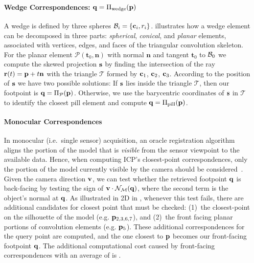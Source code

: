 \paragraph{Wedge Correspondences: $\mathbf{q}=\Pi_\text{wedge}(\mathbf{p})$}
A wedge is defined by three spheres $\mathcal{B}_i = \{\mathbf{c}_i, r_i\}$.   illustrates how a wedge element can be decomposed in three parts: \emph{spherical}, \emph{conical}, and \emph{planar} elements, associated with vertices, edges, and faces of the triangular convolution skeleton. For the planar element $\mathcal{P}(\mathbf{t}_0,\mathbf{n})$ with normal $\mathbf{n}$ and tangent $\mathbf{t}_0$ to $\mathcal{B}_0$
%
we compute the skewed projection $\mathbf{s}$ by finding the intersection of the ray $\mathbf{r}(t) = \mathbf{p} + t\mathbf{n}$ with the triangle $\mathcal{T}$ formed by $\mathbf{c}_1$, $\mathbf{c}_2$, $\mathbf{c}_3$. 
% 
According to the position of $\mathbf{s}$ we have two possible solutions:
If $\mathbf{s}$ lies inside the triangle $\mathcal{T}$, then our footpoint is $\mathbf{q} = \Pi_\mathcal{P}(\mathbf{p})$. Otherwise, we use the barycentric coordinates of $\mathbf{s}$ in $\mathcal{T}$ to identify the closest pill element and compute $\mathbf{q}=\Pi_\text{pill}(\mathbf{p})$.

\paragraph{Monocular Correspondences}
In monocular (i.e.\ single sensor) acquisition, an oracle registration algorithm aligns the portion of the model that is \emph{visible} from the sensor viewpoint to the available data. Hence, when computing ICP's closest-point correspondences, only the portion of the model currently visible by the camera should be considered~\cite{tagliasacchi2015robust}. Given the camera direction $\mathbf{v}$, we can test whether the retrieved footpoint $\mathbf{q}$ is back-facing by testing the sign of $\mathbf{v} \cdot \mathcal{N}_{\mathcal{M}}(\mathbf{q})$, where the second term is the object's normal at $\mathbf{q}$. As illustrated in 2D in , whenever this test fails, there are additional candidates for closest point that must be checked: (1)~the closest-point on the silhouette of the model (e.g. $\mathbf{p}_{2,3,6,7}$), and (2)~the front facing planar portions of convolution elements (e.g. $\mathbf{p}_{5}$). These additional correspondences for the query point are computed, and the one closest to $\mathbf{p}$ becomes our front-facing footpoint $\mathbf{q}$. The additional computational cost caused by front-facing correspondences with an average of  is .

